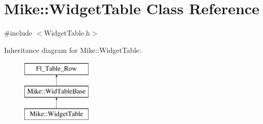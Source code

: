 \hypertarget{class_mike_1_1_widget_table}{}\section{Mike\+:\+:Widget\+Table Class Reference}
\label{class_mike_1_1_widget_table}


{\ttfamily \#include $<$Widget\+Table.\+h$>$}

Inheritance diagram for Mike\+:\+:Widget\+Table\+:\begin{figure}[H]
\begin{center}
\leavevmode
\includegraphics[height=3.000000cm]{class_mike_1_1_widget_table}
\end{center}
\end{figure}
